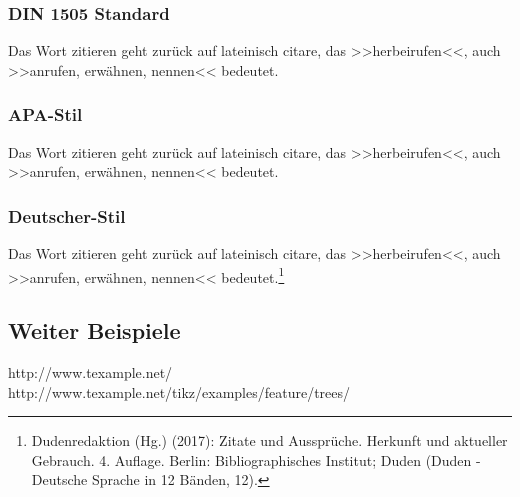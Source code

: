 \subsubsection{DIN 1505 Standard}
\glqq Das Wort zitieren geht zurück auf lateinisch citare, das >>herbeirufen<<, auch >>anrufen, erwähnen, nennen<< bedeutet.\grqq [Dud17]

\subsubsection{APA-Stil}
\glqq Das Wort zitieren geht zurück auf lateinisch citare, das >>herbeirufen<<, auch >>anrufen, erwähnen, nennen<< bedeutet.\grqq [Dudenredaktion.2017]

\subsubsection{Deutscher-Stil}
\glqq Das Wort zitieren geht zurück auf lateinisch citare, das >>herbeirufen<<, auch >>anrufen, erwähnen, nennen<< bedeutet.\grqq\footnote{Dudenredaktion (Hg.) (2017): Zitate und Aussprüche. Herkunft und aktueller Gebrauch. 4. Auflage. Berlin: Bibliographisches Institut; Duden (Duden - Deutsche Sprache in 12 Bänden, 12).}

\subsection{Weiter Beispiele}
http://www.texample.net/\\
http://www.texample.net/tikz/examples/feature/trees/